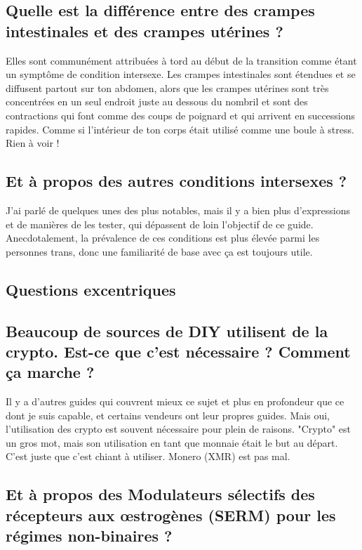 \documentclass{article}
\begin{document}
\subsection{Quelle est la différence entre des crampes intestinales et des crampes utérines ?}\label{11-35}

Elles sont communément attribuées à tord au début de la transition comme étant un symptôme de condition intersexe. Les crampes intestinales sont étendues et se diffusent partout sur ton abdomen, alors que les crampes utérines sont très concentrées en un seul endroit juste au dessous du nombril et sont des contractions qui font comme des coups de poignard et qui arrivent en successions rapides. Comme si l'intérieur de ton corps était utilisé comme une boule à stress. Rien à voir !

\subsection{Et à propos des autres conditions intersexes ?}

J'ai parlé de quelques unes des plus notables, mais il y a bien plus d'expressions et de manières de les tester, qui dépassent de loin l'objectif de ce guide. Anecdotalement, la prévalence de ces conditions est plus élevée parmi les personnes trans, donc une familiarité de base avec ça est toujours utile.

\subsection*{Questions excentriques}

\subsection{Beaucoup de sources de DIY utilisent de la crypto. Est-ce que c'est nécessaire ? Comment ça marche ?}

Il y a d'autres guides qui couvrent mieux ce sujet et plus en profondeur que ce dont je suis capable, et certains vendeurs ont leur propres guides. Mais oui, l'utilisation des crypto est souvent nécessaire pour plein de raisons. "Crypto" est un gros mot, mais son utilisation en tant que monnaie était le but au départ. C'est juste que c'est chiant à utiliser. Monero (XMR) est pas mal. 

\subsection{Et à propos des Modulateurs sélectifs des récepteurs aux œstrogènes (SERM) pour les régimes non-binaires ?}
\end{document}
